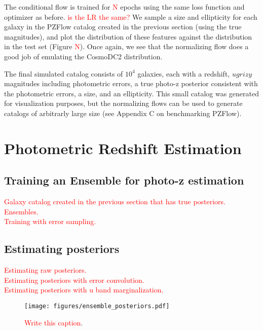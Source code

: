 \documentclass[twocolumn]{aastex631}
\newcommand{\note}[1]{\textsf{\textcolor{red}{#1}}}
\begin{document}
The conditional flow is trained for \note{N} epochs using the same loss function and optimizer as before.
\note{is the LR the same?}
We sample a size and ellipticity for each galaxy in the PZFlow catalog created in the previous section (using the true magnitudes), and plot the distribution of these features against the distribution in the test set (Figure \note{N}).
Once again, we see that the normalizing flow does a good job of emulating the CosmoDC2 distribution.

The final simulated catalog consists of $10^4$ galaxies, each with a redshift, $ugrizy$ magnitudes including photometric errors, a true photo-z posterior consistent with the photometric errors, a size, and an ellipticity.
This small catalog was generated for visualization purposes, but the normalizing flows can be used to generate catalogs of arbitrarly large size (see Appendix C on benchmarking PZFlow).


\section{Photometric Redshift Estimation}
\label{sec:photo-z}

\subsection{Training an Ensemble for photo-z estimation}

\note{
    Galaxy catalog created in the previous section that has true posteriors. \\
    Ensembles. \\
    Training with error sampling.
}

\subsection{Estimating posteriors}

\note{
    Estimating raw posteriors. \\
    Estimating posteriors with error convolution. \\
    Estimating posteriors with u band marginalization.
}

\begin{figure*}[t!]
    \begin{centering}
        \texttt{[image: figures/ensemble\_posteriors.pdf]}
        \caption{
            \note{Write this caption}.
        }
        \label{fig:ensemble-posteriors}
    \end{centering}
\end{figure*}
\end{document}
